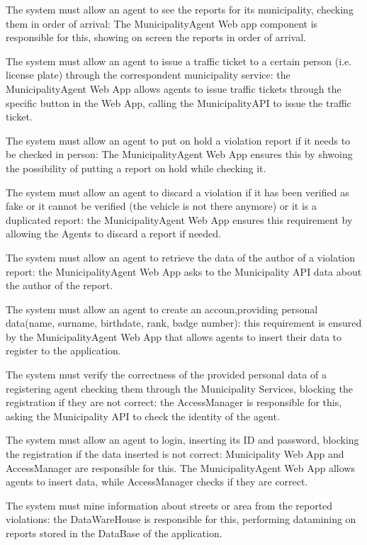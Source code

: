 \documentclass[a4paper]{report}
\begin{document}
\begin{enumerate}[start=1,label={[R\arabic*]}]
\item The system must allow an agent to see the reports for its municipality, checking them in order of arrival: The MunicipalityAgent Web app component is responsible for this, showing on screen the reports in order of arrival.
\item The system must allow an agent to issue a traffic ticket to a certain person (i.e. license plate) through the correspondent municipality service: the MunicipalityAgent Web App allows agents to issue traffic tickets through the specific button in the Web App, calling the MunicipalityAPI to issue the traffic ticket.
\item The system must allow an agent to put on hold a violation report if it needs to be checked in person: The MunicipalityAgent Web App ensures this by shwoing the possibility of putting a report on hold while checking it.
\item The system must allow an agent to discard a violation if it has been verified as fake or it cannot be verified (the vehicle is not there anymore) or it is a duplicated report: the MunicipalityAgent Web App ensures this requirement by allowing the Agents to discard a report if needed.
\item The system must allow an agent to retrieve the data of the author of a violation report: the MunicipalityAgent Web App asks to the Municipality API data about the author of the report. 
\item The system must allow an agent to create an accoun,providing personal data(name, surname, birthdate, rank, badge number): this requirement is ensured by  the MunicipalityAgent Web App that allows agents to insert their data to register to the application.
\item The system must verify the correctness of the provided personal data of a registering agent checking them through the Municipality Services, blocking the registration if they are not correct: the AccessManager is responsible for this, asking the Municipality API to check the identity of the agent.
\item The system must allow an agent to login, inserting its ID and password, blocking the registration if the data inserted is not correct: Municipality Web App and AccessManager are responsible for this. The MunicipalityAgent Web App allows agents to insert data, while AccessManager checks if they are correct.
\item The system must mine information about streets or area from the reported violations: the DataWareHouse is responsible for this, performing datamining on reports stored in the DataBase of the application.

\end{enumerate}
\end{document}

